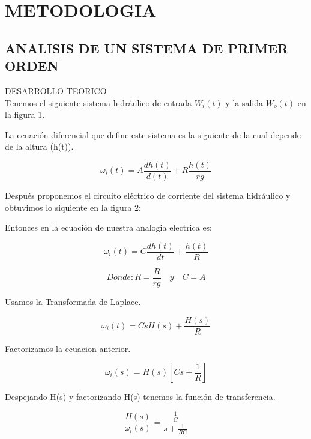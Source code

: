 \documentclass{report}
\newcounter{ns}
\begin{document}
	
			
		\chapter*{METODOLOGIA}
	\section{ANALISIS DE UN SISTEMA DE PRIMER ORDEN}
	
	DESARROLLO TEORICO\\
	
	Tenemos el siguiente sistema hidráulico de entrada $W_i (t)$ y la salida $W_o (t)$ en la figura 1.
	
	

	La ecuación diferencial que define este sistema es la siguiente de la cual depende de la altura (h(t)).
	
	\begin{equation*}
		\omega_i(t)=A\frac{dh(t)}{d(t)}+R\frac{h(t)}{rg}
	\end{equation*}
	
	Después proponemos el circuito eléctrico de corriente del sistema hidráulico y obtuvimos lo siquiente en la figura 2:
	
	
	 
	Entonces en la ecuación de nuestra analogia electrica es:
	
	\begin{equation*}
		 \omega_i(t)=C\frac{dh(t)}{dt}+\frac{h(t)}{R}
	\end{equation*}
	
	\begin{equation*}
		Donde:	R=\frac{R}{rg}\quad y \quad C=A
	\end{equation*}
	
	Usamos la Transformada de Laplace.
	
	\begin{equation*}
		\omega_i(t)=CsH(s) + \frac{H(s)}{R}
	\end{equation*}
	
	Factorizamos la ecuacion anterior.
	
	\begin{equation*}
		\omega_i(s)=H(s) \left[Cs+\frac{1}{R}\right]
	\end{equation*}
	
	Despejando H(s) y factorizando H(s) tenemos la función de transferencia.
	
	\begin{equation*}
		\frac{H(s)}{\omega_i(s)}=\frac{\frac{1}{C}}{s+\frac{1}{RC}}
	\end{equation*}
	
\end{document}
